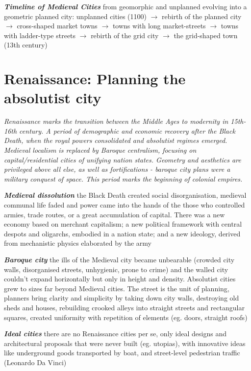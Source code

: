 \documentclass{article}
\newcommand{\bisection}[1]{\textbf{\textit{#1}}}
\begin{document}
\bisection{Timeline of Medieval Cities} from geomorphic and unplanned evolving into a geometric planned city: unplanned cities (1100) $\rightarrow$ rebirth of the planned city $\rightarrow$ cross-shaped market towns $\rightarrow$ towns with long market-streets $\rightarrow$ towns with ladder-type streets $\rightarrow$ rebirth of the grid city $\rightarrow$ the grid-shaped town (13th century)

\pagebreak
\section{Renaissance: Planning the absolutist city}

\textit{Renaissance marks the transition between the Middle Ages to modernity in 15th-16th century. A period of demographic and economic recovery after the Black Death, when the royal powers consolidated and absolutist regimes emerged. Medieval localism is replaced by Baroque centralism, focusing on capital/residential cities of unifying nation states. Geometry and aesthetics are privileged above all else, as well as fortifications - baroque city plans were a military conquest of space. This period marks the beginning of colonial empires.}

\bisection{Medieval dissolution} the Black Death created social disorganisation, medieval communal life faded and power came into the hands of the those who controlled armies, trade routes, or a great accumulation of capital. There was a new economy based on merchant capitalism; a new political framework with central despots and oligarchs, embodied in a nation state; and a new ideology, derived from mechanistic physics elaborated by the army

\bisection{Baroque city} the ills of the Medieval city became unbearable (crowded city walls, disorganised streets, unhygienic, prone to crime) and the walled city couldn't expand horizontally but only in height and density. Absolutist cities grew to sizes far beyond Medieval cities. The street is the unit of planning, planners bring clarity and simplicity by taking down city walls, destroying old sheds and houses, rebuilding crooked alleys into straight streets and rectangular squares, created uniformity with repetition of elements (eg. doors, straight roofs)

\bisection{Ideal cities} there are no Renaissance cities per se, only ideal designs and architectural proposals that were never built (eg. utopias), with innovative ideas like underground goods transported by boat, and street-level pedestrian traffic (Leonardo Da Vinci)
\end{document}
